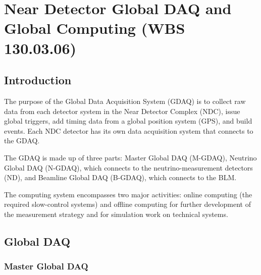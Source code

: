 \chapter{Near Detector Global DAQ and Global Computing (WBS 130.03.06)}
\label{ch:nd-gdaq}


\section{Introduction}
\label{sec:nd-gdaq-intro}

The purpose of the Global Data Acquisition System (GDAQ) is to collect 
raw data from each detector system in the Near Detector Complex (NDC), 
issue global triggers, add timing data from a global position system 
(GPS), and build events. Each NDC detector has its own data acquisition 
system that connects to the GDAQ.  

The GDAQ is made up of three parts: 
Master Global DAQ (M-GDAQ), Neutrino Global DAQ (N-GDAQ), which connects to the neutrino-measurement detectors (ND), and Beamline 
Global DAQ (B-GDAQ), which connects to the BLM.


The computing system encompasses two major activities: online computing (the required
slow-control systems) and offline computing for further development of the measurement strategy and for simulation work on technical systems.

\section{Global DAQ}
\label{sec:nd-gdaq-global-daq}

\subsection{Master Global DAQ}
\label{subsec:M-GDAQ}

